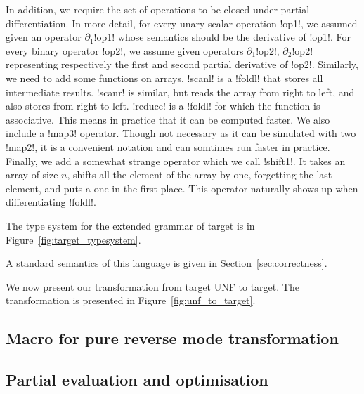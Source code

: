 In addition, we require the set of operations to be closed under partial differentiation. 
In more detail, for every unary scalar operation !op1!, 
we assumed given an operator $\partial_1$!op1! whose semantics should be the derivative of !op1!.
For every binary operator !op2!, we assume given operators $\partial_1$!op2!, $\partial_2$!op2! 
representing respectively the first and second partial derivative of !op2!.
Similarly, we need to add some functions on arrays. 
!scanl! is a !foldl! that stores all intermediate results. 
!scanr! is similar, but reads the array from right to left, and also stores from right to left.
!reduce! is a !foldl! for which the function is associative. 
This means in practice that it can be computed faster.
We also include a !map3! operator. 
Though not necessary as it can be simulated with two !map2!, it is a convenient notation and can somtimes run faster in practice.
Finally, we add a somewhat strange operator which we call !shift1!. 
It takes an array of size $n$,  shifts all the element of the array by one, 
forgetting the last element, and puts a one in the first place. 
This operator naturally shows up when differentiating !foldl!.

The type system for the extended grammar of target is in Figure~\ref{fig:target_typesystem}. 



A standard semantics of this language is given in Section~\ref{sec:correctness}.

We now present our transformation from target UNF to target. 
The transformation is presented in Figure~\ref{fig:unf_to_target}.



\subsection{Macro for pure reverse mode transformation} %
\label{sub:Macro for pure reverse mode transformation}

\subsection{Partial evaluation and optimisation} %
\label{sub:Partial evaluation and optimisation}

